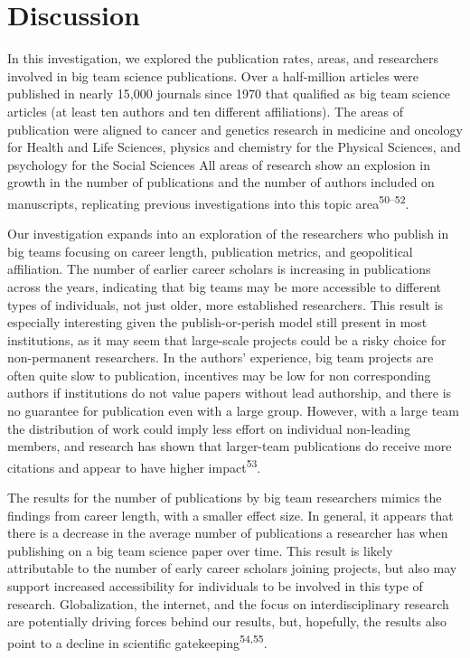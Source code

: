 \documentclass[
  man,floatsintext]{apa6}
\begin{document}
\hypertarget{discussion}{%
\section{Discussion}\label{discussion}}

In this investigation, we explored the publication rates, areas, and
researchers involved in big team science publications. Over a
half-million articles were published in nearly 15,000 journals since
1970 that qualified as big team science articles (at least ten authors
and ten different affiliations). The areas of publication were aligned
to cancer and genetics research in medicine and oncology for Health and
Life Sciences, physics and chemistry for the Physical Sciences, and
psychology for the Social Sciences All areas of research show an
explosion in growth in the number of publications and the number of
authors included on manuscripts, replicating previous investigations
into this topic area\textsuperscript{50--52}.

Our investigation expands into an exploration of the researchers who
publish in big teams focusing on career length, publication metrics, and
geopolitical affiliation. The number of earlier career scholars is
increasing in publications across the years, indicating that big teams
may be more accessible to different types of individuals, not just
older, more established researchers. This result is especially
interesting given the publish-or-perish model still present in most
institutions, as it may seem that large-scale projects could be a risky
choice for non-permanent researchers. In the authors' experience, big
team projects are often quite slow to publication, incentives may be low
for non corresponding authors if institutions do not value papers
without lead authorship, and there is no guarantee for publication even
with a large group. However, with a large team the distribution of work
could imply less effort on individual non-leading members, and research
has shown that larger-team publications do receive more citations and
appear to have higher impact\textsuperscript{53}.

The results for the number of publications by big team researchers
mimics the findings from career length, with a smaller effect size. In
general, it appears that there is a decrease in the average number of
publications a researcher has when publishing on a big team science
paper over time. This result is likely attributable to the number of
early career scholars joining projects, but also may support increased
accessibility for individuals to be involved in this type of research.
Globalization, the internet, and the focus on interdisciplinary research
are potentially driving forces behind our results, but, hopefully, the
results also point to a decline in scientific gatekeeping\textsuperscript{54,55}.
\end{document}
